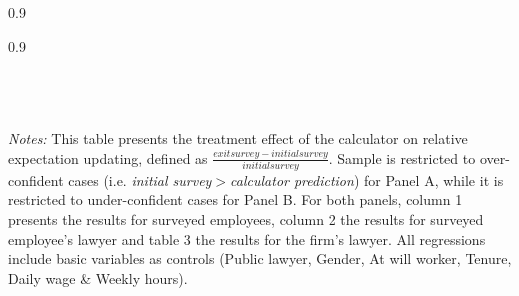 \begin{table}[!ht]
\caption{Treatment generated updating in probability - Phase 1}
\label{update_rel_oc}
  
    \begin{subtable}{0.9\textwidth}
      \centering
        \caption{Overconfidents}
        \scriptsize{}
    \end{subtable}%
    
    \bigskip
    \begin{subtable}{0.9\textwidth}
      \centering
        \caption{Underconfidents}
        \scriptsize{}
    \end{subtable} 
     \scriptsize
    \\
    \\
    \\
\textit{Notes:} 
This table presents the treatment effect of the calculator on relative expectation updating, defined as $\frac{exitsurvey-initialsurvey}{initialsurvey}$.  Sample is restricted to over-confident cases (i.e. \textit{initial survey}$>$\textit{calculator prediction}) for Panel A, while it is restricted to under-confident cases for Panel B. For both panels, column 1 presents the results for surveyed employees, column 2 the results for surveyed employee's lawyer and table 3 the results for the firm's lawyer. All regressions include basic variables as controls (Public lawyer, Gender, At will worker, Tenure, Daily wage \& Weekly hours).


\end{table}

